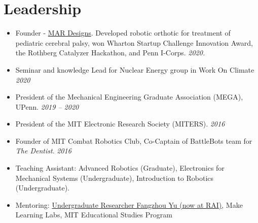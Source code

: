 \documentclass[letterpaper,11pt]{article}
\newcommand{\resumeLeadership}[1]{\item{#1}}
\begin{document}
\section{Leadership}
\begin{itemize}[leftmargin=*,nolistsep, noitemsep]\small
%
\resumeLeadership{Founder - \href{https://mar-designs.com}{MAR Designs}. Developed robotic orthotic for treatment of pediatric cerebral palsy, won Wharton Startup Challenge Innovation Award, the Rothberg Catalyzer Hackathon, and Penn I-Corps. \textit{2020.}}
%
\resumeLeadership{Seminar and knowledge Lead for Nuclear Energy group in Work On Climate \textit{2020}}
%
\resumeLeadership{President of the Mechanical Engineering Graduate Association (MEGA), UPenn. \textit{2019 -- 2020}}
%
\resumeLeadership{President of the MIT Electronic Research Society (MITERS). \textit{2016}}
%
\resumeLeadership{Founder of MIT Combat Robotics Club, Co-Captain of BattleBots team for \textit{The Dentist}. \textit{2016}}
%
\resumeLeadership{Teaching Assistant: Advanced Robotics (Graduate), Electronics for Mechanical Systems (Undergraduate), Introduction to Robotics (Undergraduate).}
%
\resumeLeadership{Mentoring: \href{https://www.yufangzhou.xyz/}{Undergraduate Researcher Fangzhou Yu (now at \href{https://rai-inst.com/}{RAI})}, Make Learning Labs, MIT Educational Studies Program}

\end{itemize}
\end{document}
